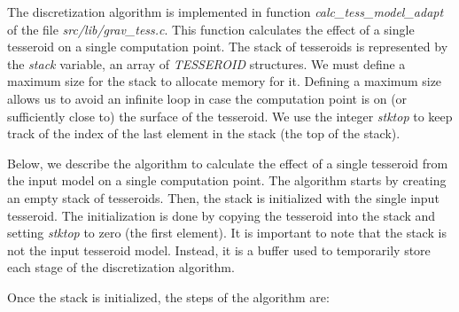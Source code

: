 \documentclass[paper,twocolumn,twoside]{geophysics}
\begin{document}
The discretization algorithm is implemented in
function \emph{calc\_tess\_model\_adapt}
of the file \emph{src/lib/grav\_tess.c}.
This function calculates the effect of a single tesseroid
on a single computation point.
The stack of tesseroids is represented by
the \emph{stack} variable,
an array of \emph{TESSEROID} structures.
We must define a maximum size for the stack to allocate memory for it.
Defining a maximum size allows us to
avoid an infinite loop
in case the computation point is on
(or sufficiently close to) the surface of the tesseroid.
We use the integer \emph{stktop}
to keep track of the index of
the last element in the stack (the top of the stack).

Below, we describe the algorithm to calculate
the effect of a single tesseroid from the input model
on a single computation point.
The algorithm starts by creating an empty stack of tesseroids.
Then, the stack is initialized with the single input tesseroid.
The initialization is done by copying the tesseroid into the stack
and setting \emph{stktop} to zero (the first element).
It is important to note that the stack is not the input tesseroid model.
Instead, it is a buffer used to temporarily store
each stage of the discretization algorithm.

Once the stack is initialized, the steps of the algorithm are:
\end{document}
